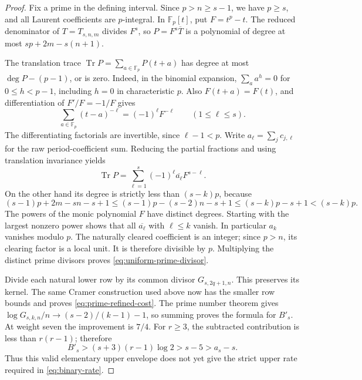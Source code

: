 \documentclass[11pt]{article}
\theoremstyle{remark}
\begin{document}
\begin{proof}
Fix a prime in the defining interval. Since \(p>n\ge s-1\), we
have \(p\ge s\), and all Laurent coefficients are \(p\)-integral.
In \(\mathbb F_p[t]\), put \(F=t^p-t\). The reduced denominator
of \(T=T_{s,n,m}\) divides \(F^s\), so \(P=F^s\overline T\)
is a polynomial of degree at most \(sp+2m-s(n+1)\).

The translation trace \(\operatorname{Tr}P=\sum_{a\in\mathbb F_p}P(t+a)\)
has degree at most \(\deg P-(p-1)\), or is zero. Indeed, in the
binomial expansion, \(\sum_a a^h=0\) for \(0\le h<p-1\),
including \(h=0\) in characteristic \(p\). Also \(F(t+a)=F(t)\),
and differentiation of \(F'/F=-1/F\) gives
\[
 \sum_{a\in\mathbb F_p}(t-a)^{-\ell}
     =(-1)^\ell F^{-\ell}\qquad(1\le\ell\le s).
\]
The differentiating factorials are invertible, since \(\ell-1<p\).
Write \(a_\ell=\sum_jc_{j,\ell}\) for the raw period-coefficient sum.
Reducing the partial fractions and using translation invariance yields
\[
 \operatorname{Tr}P=\sum_{\ell=1}^s(-1)^\ell\overline{a_\ell}F^{s-\ell}.
\]
On the other hand its degree is strictly less than \((s-k)p\), because
\[
 (s-1)p+2m-sn-s+1
 \le(s-1)p-(s-2)n-s+1
 \le(s-k)p-s+1<(s-k)p.
\]
The powers of the monic polynomial \(F\) have distinct degrees. Starting
with the largest nonzero power shows that all \(\overline{a_\ell}\)
with \(\ell\le k\) vanish. In particular \(a_k\) vanishes modulo \(p\).
The naturally cleared coefficient is an integer; since \(p>n\),
its clearing factor is a local unit. It is therefore divisible by \(p\).
Multiplying the distinct prime divisors proves
\eqref{eq:uniform-prime-divisor}.

Divide each natural lower row by its common divisor \(G_{s,2q+1,n}\).
This preserves its kernel. The same Cramer construction used above now
has the smaller row bounds and proves \eqref{eq:prime-refined-cost}.
The prime number theorem gives
\(\log G_{s,k,n}/n\to(s-2)/(k-1)-1\), so summing proves the
formula for \(B'_s\). At weight seven the improvement is \(7/4\).
For \(r\ge3\), the subtracted contribution is less than \(r(r-1)\);
therefore
\[
 B'_s>(s+3)(r-1)\log2>s-5>a_s-s.
\]
Thus this valid elementary upper envelope does not yet give the strict
upper rate required in \eqref{eq:binary-rate}.
\end{proof}
\end{document}
